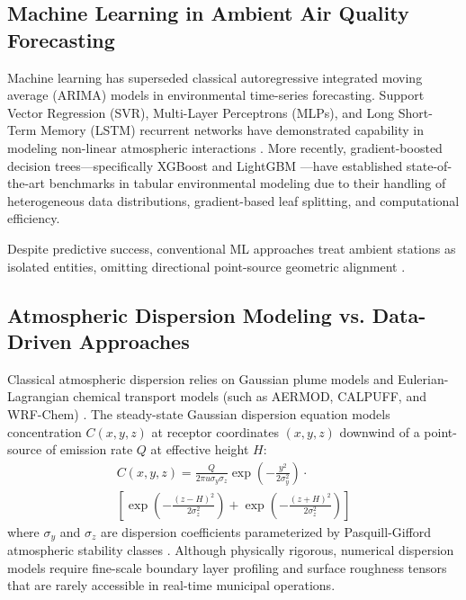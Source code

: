 \documentclass[conference]{IEEEtran}
\begin{document}
\subsection{Machine Learning in Ambient Air Quality Forecasting}
Machine learning has superseded classical autoregressive integrated moving average (ARIMA) models in environmental time-series forecasting. Support Vector Regression (SVR), Multi-Layer Perceptrons (MLPs), and Long Short-Term Memory (LSTM) recurrent networks have demonstrated capability in modeling non-linear atmospheric interactions \cite{ray2019urban, lecun2015deep}. More recently, gradient-boosted decision trees---specifically XGBoost \cite{chen2016xgboost} and LightGBM \cite{ke2017lightgbm}---have established state-of-the-art benchmarks in tabular environmental modeling due to their handling of heterogeneous data distributions, gradient-based leaf splitting, and computational efficiency. 

Despite predictive success, conventional ML approaches treat ambient stations as isolated entities, omitting directional point-source geometric alignment \cite{prasad2017nocturnal}.

\subsection{Atmospheric Dispersion Modeling vs. Data-Driven Approaches}
Classical atmospheric dispersion relies on Gaussian plume models and Eulerian-Lagrangian chemical transport models (such as AERMOD, CALPUFF, and WRF-Chem) \cite{carruthers1994uk}. The steady-state Gaussian dispersion equation models concentration $C(x, y, z)$ at receptor coordinates $(x, y, z)$ downwind of a point-source of emission rate $Q$ at effective height $H$:
\begin{equation}
\begin{split}
C(x, y, z) = \frac{Q}{2\pi u \sigma_y \sigma_z} \exp\left( -\frac{y^2}{2\sigma_y^2} \right) \cdot \\
\left[ \exp\left( -\frac{(z-H)^2}{2\sigma_z^2} \right) + \exp\left( -\frac{(z+H)^2}{2\sigma_z^2} \right) \right]
\end{split}
\end{equation}
where $\sigma_y$ and $\sigma_z$ are dispersion coefficients parameterized by Pasquill-Gifford atmospheric stability classes \cite{pasquill1961estimation}. Although physically rigorous, numerical dispersion models require fine-scale boundary layer profiling and surface roughness tensors that are rarely accessible in real-time municipal operations.
\end{document}
